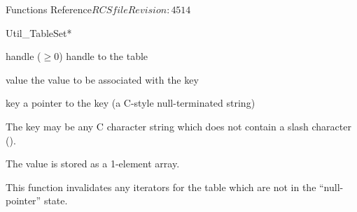 \begin{cactuspart}{ Functions Reference}{$RCSfile$}{$Revision: 4514 $}
\begin{FunctionDescription}{Util\_TableSet*}
\begin{ParameterSection}
\begin{Parameter}{handle ($\ge 0$)}
handle to the table
\end{Parameter}
\begin{Parameter}{value}
the value to be associated with the key
\end{Parameter}
\begin{Parameter}{key}
a pointer to the key (a C-style null-terminated string)
\end{Parameter}
\end{ParameterSection}

\begin{Discussion}
The key may be any C character string which does not contain a slash
character ().

The value is stored as a 1-element array.

This function invalidates any iterators for the table which are
not in the ``null-pointer'' state.
\end{Discussion}


\end{FunctionDescription}
\end{cactuspart}
